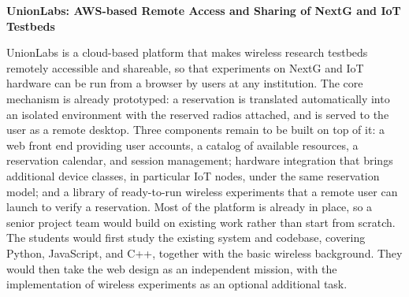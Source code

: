 \documentclass[11pt]{article}
\begin{document}
\begin{center}
{\large\bfseries UnionLabs: AWS-based Remote Access and Sharing of NextG
and IoT Testbeds}
\end{center}

\vspace{1em}

UnionLabs is a cloud-based platform that makes wireless research testbeds
remotely accessible and shareable, so that experiments on NextG and IoT
hardware can be run from a browser by users at any institution. The core
mechanism is already prototyped: a reservation is translated automatically
into an isolated environment with the reserved radios attached, and is served
to the user as a remote desktop. Three components remain to be built on top of
it: a web front end providing user accounts, a catalog of available resources,
a reservation calendar, and session management; hardware integration that
brings additional device classes, in particular IoT nodes, under the same
reservation model; and a library of ready-to-run wireless experiments that a
remote user can launch to verify a reservation. Most of the platform is
already in place, so a senior project team would build on existing work rather
than start from scratch. The students would first study the existing system
and codebase, covering Python, JavaScript, and C++, together with the basic
wireless background. They would then take the web design as an independent
mission, with the implementation of wireless experiments as an optional
additional task.
\end{document}
